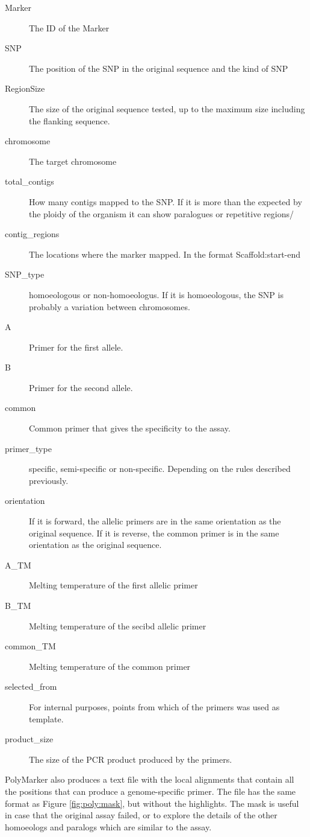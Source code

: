 \begin{description}
\item[Marker] The ID of the Marker
\item[SNP] The position of the SNP in the original sequence and the kind of SNP
\item[RegionSize] The size of the original sequence tested, up to the maximum size including the flanking sequence. 
\item[chromosome] The target chromosome
\item[total\_contigs] How many contigs mapped to the SNP. If it is more than the expected by the ploidy of the organism it can show paralogues or repetitive regions/
\item[contig\_regions] The locations where the marker mapped. In the format Scaffold:start-end
\item[SNP\_type] homoeologous or non-homoeologus. If it is homoeologous, the SNP is probably a variation between chromosomes. 
\item[A] Primer for the first allele.
\item[B] Primer for the second allele.
\item[common] Common primer that gives the specificity to the assay.
\item[primer\_type] specific, semi-specific or non-specific. Depending on the rules described previously. 
\item[orientation] If it is forward, the allelic primers are in the same orientation as the original sequence. If it is reverse, the common primer is in the same orientation as the original sequence.
\item[A\_TM] Melting temperature of the first allelic primer
\item[B\_TM] Melting temperature of the secibd allelic primer
\item[common\_TM] Melting temperature of the common primer
\item[selected\_from] For internal purposes, points from which of the primers was used as template. 
\item[product\_size] The size of the PCR product produced by the primers. 
\end{description}

PolyMarker also produces a text file with the local alignments that contain all the positions that can produce a genome-specific primer. 
The file has the same format as Figure \ref{fig:poly:mask}, but without the highlights. 
The mask is useful in case that the original assay failed, or to explore the details of the other homoeologs and paralogs which are similar to the assay. 

